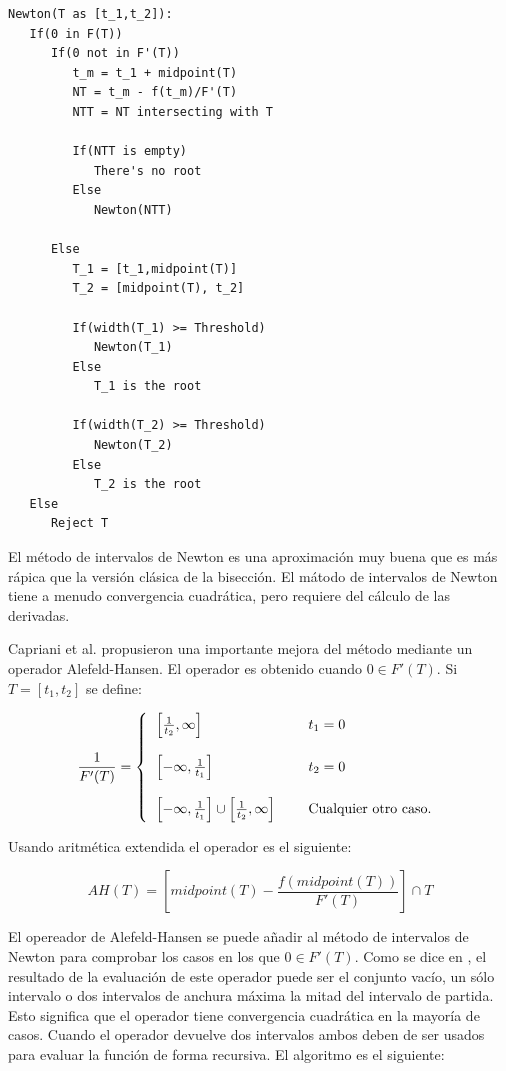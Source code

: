 \begin{verbatim}
Newton(T as [t_1,t_2]):
   If(0 in F(T))
      If(0 not in F'(T))
         t_m = t_1 + midpoint(T)
         NT = t_m - f(t_m)/F'(T)
         NTT = NT intersecting with T
        
         If(NTT is empty)
            There's no root
         Else
            Newton(NTT)
        
      Else
         T_1 = [t_1,midpoint(T)]
         T_2 = [midpoint(T), t_2]
         
         If(width(T_1) >= Threshold)
            Newton(T_1)
         Else
            T_1 is the root
            
         If(width(T_2) >= Threshold)
            Newton(T_2)
         Else
            T_2 is the root
   Else
      Reject T
\end{verbatim}

El método de intervalos de Newton es una aproximación muy buena que es más rápica que la versión clásica de la bisección. El mátodo de intervalos de Newton tiene a menudo convergencia cuadrática, pero requiere del cálculo de las derivadas.
\par Capriani et al. propusieron una importante mejora del método mediante un operador Alefeld-Hansen. El operador es obtenido cuando $0 \in F'(T)$. Si $T = [t_1,t_2]$ se define: \cite{Alefeld70,Hansen78}

\begin{equation}
\frac{1}{F'(T)} = \left\{ \begin{tabular}{l l l}
$\left[ \frac{1}{t_2}, \infty \right]$ & & $t_1 = 0$ \\ \\
$\left[ - \infty, \frac{1}{t_1} \right]$ & & $t_2 = 0$ \\ \\
$\left[ - \infty, \frac{1}{t_1} \right] \cup \left[ \frac{1}{t_2}, \infty \right]$ & & Cualquier otro caso.
\end{tabular}
\right.
\nonumber
\end{equation}

Usando aritmética extendida \cite{Hansen03} el operador es el siguiente:

\begin{equation}
AH(T) = \left[ midpoint(T) - \frac{f(midpoint(T))}{F'(T)} \right] \cap T
\nonumber
\end{equation}

El opereador de Alefeld-Hansen se puede añadir al método de intervalos de Newton para comprobar los casos en los que $0 \in F'(T)$. Como se dice en \cite{Capriani00}, el resultado de la evaluación de este operador puede ser el conjunto vacío, un sólo intervalo o dos intervalos de anchura máxima la mitad del intervalo de partida. Esto significa que el operador tiene convergencia cuadrática en la mayoría de casos. Cuando el operador devuelve dos intervalos ambos deben de ser usados para evaluar la función de forma recursiva. El algoritmo es el siguiente:

